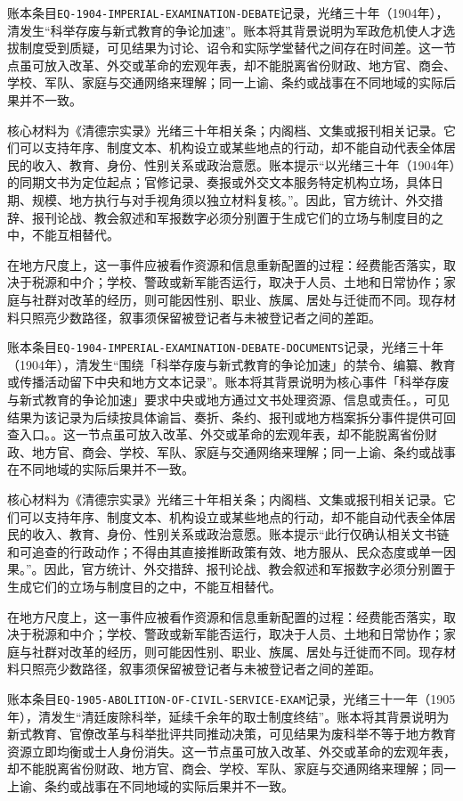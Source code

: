 账本条目\texttt{EQ-1904-IMPERIAL-EXAMINATION-DEBATE}记录，光绪三十年（1904年），清发生“科举存废与新式教育的争论加速”。账本将其背景说明为军政危机使人才选拔制度受到质疑，可见结果为讨论、诏令和实际学堂替代之间存在时间差。这一节点虽可放入改革、外交或革命的宏观年表，却不能脱离省份财政、地方官、商会、学校、军队、家庭与交通网络来理解；同一上谕、条约或战事在不同地域的实际后果并不一致。

核心材料为《清德宗实录》光绪三十年相关条；内阁档、文集或报刊相关记录。它们可以支持年序、制度文本、机构设立或某些地点的行动，却不能自动代表全体居民的收入、教育、身份、性别关系或政治意愿。账本提示“以光绪三十年（1904年）的同期文书为定位起点；官修记录、奏报或外交文本服务特定机构立场，具体日期、规模、地方执行与对手视角须以独立材料复核。”。因此，官方统计、外交措辞、报刊论战、教会叙述和军报数字必须分别置于生成它们的立场与制度目的之中，不能互相替代。

在地方尺度上，这一事件应被看作资源和信息重新配置的过程：经费能否落实，取决于税源和中介；学校、警政或新军能否运行，取决于人员、土地和日常协作；家庭与社群对改革的经历，则可能因性别、职业、族属、居处与迁徙而不同。现存材料只照亮少数路径，叙事须保留被登记者与未被登记者之间的差距。

账本条目\texttt{EQ-1904-IMPERIAL-EXAMINATION-DEBATE-DOCUMENTS}记录，光绪三十年（1904年），清发生“围绕「科举存废与新式教育的争论加速」的禁令、编纂、教育或传播活动留下中央和地方文本记录”。账本将其背景说明为核心事件「科举存废与新式教育的争论加速」要求中央或地方通过文书处理资源、信息或责任。，可见结果为该记录为后续按具体谕旨、奏折、条约、报刊或地方档案拆分事件提供可回查入口。。这一节点虽可放入改革、外交或革命的宏观年表，却不能脱离省份财政、地方官、商会、学校、军队、家庭与交通网络来理解；同一上谕、条约或战事在不同地域的实际后果并不一致。

核心材料为《清德宗实录》光绪三十年相关条；内阁档、文集或报刊相关记录。它们可以支持年序、制度文本、机构设立或某些地点的行动，却不能自动代表全体居民的收入、教育、身份、性别关系或政治意愿。账本提示“此行仅确认相关文书链和可追查的行政动作；不得由其直接推断政策有效、地方服从、民众态度或单一因果。”。因此，官方统计、外交措辞、报刊论战、教会叙述和军报数字必须分别置于生成它们的立场与制度目的之中，不能互相替代。

在地方尺度上，这一事件应被看作资源和信息重新配置的过程：经费能否落实，取决于税源和中介；学校、警政或新军能否运行，取决于人员、土地和日常协作；家庭与社群对改革的经历，则可能因性别、职业、族属、居处与迁徙而不同。现存材料只照亮少数路径，叙事须保留被登记者与未被登记者之间的差距。

账本条目\texttt{EQ-1905-ABOLITION-OF-CIVIL-SERVICE-EXAM}记录，光绪三十一年（1905年），清发生“清廷废除科举，延续千余年的取士制度终结”。账本将其背景说明为新式教育、官僚改革与科举批评共同推动决策，可见结果为废科举不等于地方教育资源立即均衡或士人身份消失。这一节点虽可放入改革、外交或革命的宏观年表，却不能脱离省份财政、地方官、商会、学校、军队、家庭与交通网络来理解；同一上谕、条约或战事在不同地域的实际后果并不一致。

